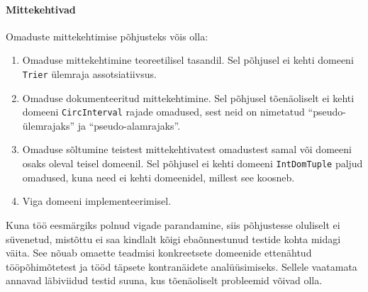 \documentclass[../thesis.tex]{subfiles}
\begin{document}
\paragraph{Mittekehtivad}
Omaduste mittekehtimise põhjusteks võis olla:
\begin{enumerate}[nosep]
	\item Omaduse mittekehtimine teoreetilisel tasandil. Sel põhjusel ei kehti domeeni \texttt{Trier} ülemraja assotsiatiivsus.
	\item Omaduse dokumenteeritud mittekehtimine. Sel põhjusel tõenäoliselt ei kehti domeeni \texttt{CircInterval} rajade omadused, sest neid on nimetatud \enquote{pseudo-ülemrajaks} ja \enquote{pseudo-alamrajaks}.
	\item Omaduse sõltumine teistest mittekehtivatest omadustest samal või domeeni osaks oleval teisel domeenil. Sel põhjusel ei kehti domeeni \texttt{IntDomTuple} paljud omadused, kuna need ei kehti domeenidel, millest see koosneb.
	\item Viga domeeni implementeerimisel.
\end{enumerate}
Kuna töö eesmärgiks polnud vigade parandamine, siis põhjustesse oluliselt ei süvenetud, mistõttu ei saa kindlalt kõigi ebaõnnestunud testide kohta midagi väita. See nõuab omaette teadmisi konkreetsete domeenide ettenähtud tööpõhimõtetest ja tööd täpsete kontranäidete analüüsimiseks. Sellele vaatamata annavad läbiviidud testid suuna, kus tõenäoliselt probleemid võivad olla.
\end{document}
